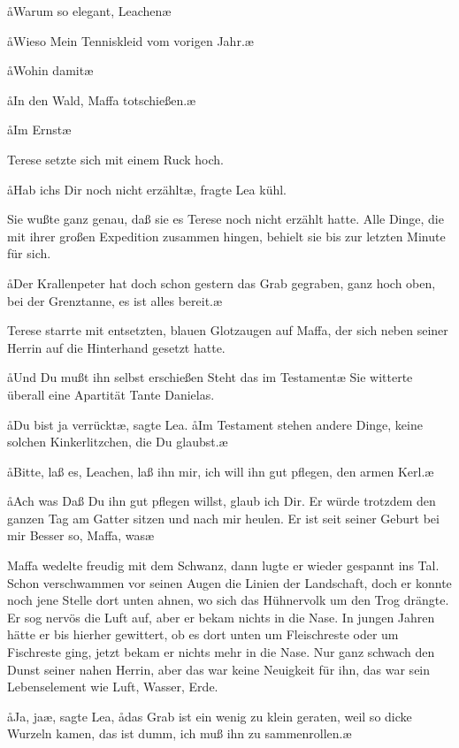 \aa Warum so elegant, Leachen\frag{}\ae

\aa Wieso\frag{} Mein Tenniskleid vom vorigen Jahr.\ae

\aa Wohin damit\frag{}\ae

\aa In den Wald, Maffa totschießen.\ae

\aa Im Ernst\frag{}\ae

Terese setzte sich mit einem Ruck hoch.

\aa Hab ichs Dir noch nicht erzählt\frag{}\ae, fragte Lea kühl.

Sie wußte ganz genau, daß sie es Terese noch nicht erzählt
hatte. Alle Dinge, die mit ihrer großen Expedition zusammen\-%
hingen, behielt sie bis zur letzten Minute für sich.

\aa Der Krallenpeter hat doch schon gestern das Grab gegraben,
ganz hoch oben, bei der Grenztanne, es ist alles bereit.\ae

Terese starrte mit entsetzten, blauen Glotzaugen auf Maffa,
der sich neben seiner Herrin auf die Hinterhand gesetzt hatte.

\aa Und Du mußt ihn selbst erschießen\frag{} Steht das im Testament\frag{}\ae{}
Sie witterte überall eine Apartität Tante Danielas.

\aa Du bist ja verrückt\ae, sagte Lea. \aa Im Testament stehen andere Dinge,
keine solchen Kinkerlitzchen, die Du glaubst.\ae

\aa Bitte, laß es, Leachen, laß ihn mir, ich will ihn gut pflegen,
den armen Kerl.\ae

\aa Ach was\ausr{} Daß Du ihn gut pflegen willst, glaub ich Dir. Er
würde trotzdem den ganzen Tag am Gatter sitzen und nach
mir heulen. Er ist seit seiner Geburt bei mir\punkte{} Besser so,
Maffa, was\frag{}\ae

Maffa wedelte freudig mit dem Schwanz, dann lugte er
wieder gespannt ins Tal. Schon verschwammen vor seinen
Augen die Linien der Landschaft, doch er konnte noch jene
Stelle dort unten ahnen, wo sich das Hühnervolk um den Trog
drängte. Er sog nervös die Luft auf, aber er bekam nichts
in die Nase. In jungen Jahren hätte er bis hierher gewittert,
ob es dort unten um Fleischreste oder um Fischreste ging, jetzt
bekam er nichts mehr in die Nase. Nur ganz schwach den Dunst
seiner nahen Herrin, aber das war keine Neuigkeit für ihn,
das war sein Lebenselement wie Luft, Wasser, Erde.

\aa Ja, ja\ae, sagte Lea, \aa das Grab ist ein wenig zu klein geraten,
weil so dicke Wurzeln kamen, das ist dumm, ich muß ihn zu\-%
sammenrollen.\ae\eingriff{zusammenrollen.\ae{} ] zusammenrollen\ae.}

